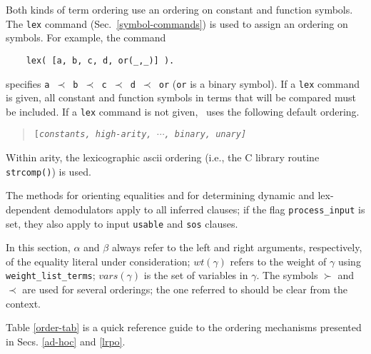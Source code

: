 \documentclass[11pt]{article}
\begin{document}
Both kinds of term ordering use an ordering on constant and function
symbols.  The \verb:lex: command (Sec.~\ref{symbol-commands}) is used
to assign an ordering on symbols.  For example, the command

{\small
\begin{verbatim}
    lex( [a, b, c, d, or(_,_)] ).
\end{verbatim}
}
\noindent
specifies {\tt a $\prec$ b $\prec$ c $\prec$ d $\prec$ or} ({\tt or}
is a binary symbol).  If a \verb:lex: command is given,
all constant and function symbols in terms that will be compared must
be included.  If a \verb:lex: command is not given, \otter\ uses
the following default ordering.
\begin{verse}
{\tt [\em constants\tt , \em high-arity\tt, $\cdots$, \em binary\tt , \em unary\tt]}
\end{verse}
Within arity, the lexicographic {\sc ascii} ordering (i.e., the
C library routine \verb:strcomp():) is used.

The methods for orienting equalities and for determining
dynamic and lex-dependent demodulators apply to all inferred clauses;
if the flag \verb:process_input: is set, they also apply to input
\verb:usable: and \verb:sos: clauses.

In this section, $\alpha$ and $\beta$ always refer to
the left and right arguments, respectively, of the equality literal
under consideration; $wt(\gamma)$ refers to the weight of
$\gamma$ using \verb:weight_list_terms:; $vars(\gamma)$ is the
set of variables in $\gamma$.  The symbols $\succ$ and $\prec$ are
used for several orderings; the one referred to should be clear
from the context.

Table \ref{order-tab} is a quick reference guide to the ordering mechanisms
presented in Secs. \ref{ad-hoc} and \ref{lrpo}.
\end{document}
